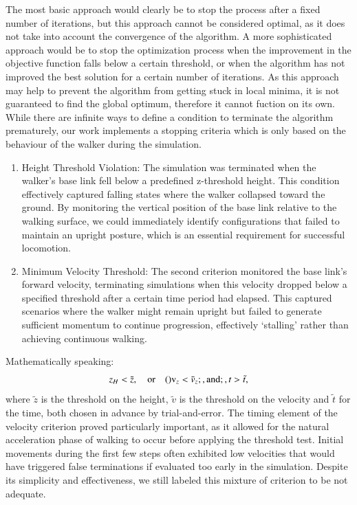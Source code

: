 The most basic approach would clearly be to stop the process after a fixed number of iterations, but this approach cannot be considered optimal, as it does not take into account the convergence of the algorithm.
A more sophisticated approach would be to stop the optimization process when the improvement in the objective function falls below a certain threshold, or when the algorithm has not improved the best solution for a certain number of iterations.
As this approach may help to prevent the algorithm from getting stuck in local minima, it is not guaranteed to find the global optimum, therefore it cannot fuction on its own.
While there are infinite ways to define a condition to terminate the algorithm prematurely, our work implements a stopping criteria which is only based on the behaviour of the walker during the simulation.

\begin{enumerate}
    \item Height Threshold Violation: The simulation was terminated when the walker's base link fell below a predefined z-threshold height.
    This condition effectively captured falling states where the walker collapsed toward the ground. 
    By monitoring the vertical position of the base link relative to the walking surface, we could immediately identify configurations that failed to maintain an upright posture, which is an essential requirement for successful locomotion.
    \item Minimum Velocity Threshold: The second criterion monitored the base link's forward velocity, terminating simulations when this velocity dropped below a specified threshold after a certain time period had elapsed. 
    This captured scenarios where the walker might remain upright but failed to generate sufficient momentum to continue progression, effectively `stalling' rather than achieving continuous walking.
\end{enumerate}

Mathematically speaking:
\[
    z_H < \tilde{z},\quad \text{or}\quad ()\text{v}_z < \tilde{v}_z ;, \text{and};, t > \tilde{t},
\]
where $\tilde{z}$ is the threshold on the height, $\tilde{v}$ is the threshold on the velocity and $\tilde{t}$ for the time, both chosen in advance by trial-and-error.
The timing element of the velocity criterion proved particularly important, as it allowed for the natural acceleration phase of walking to occur before applying the threshold test.
Initial movements during the first few steps often exhibited low velocities that would have triggered false terminations if evaluated too early in the simulation.
Despite its simplicity and effectiveness, we still labeled this mixture of criterion to be not adequate.

